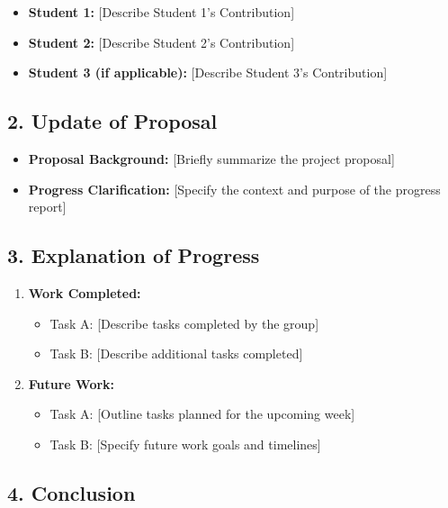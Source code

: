 \begin{itemize}
	\item \textbf{Student 1:} [Describe Student 1's Contribution]
	\item \textbf{Student 2:} [Describe Student 2's Contribution]
	\item \textbf{Student 3 (if applicable):} [Describe Student 3's Contribution]
\end{itemize}

\subsection*{2. Update of Proposal}

\begin{itemize}
	\item \textbf{Proposal Background:} [Briefly summarize the project proposal]
	\item \textbf{Progress Clarification:} [Specify the context and purpose of the progress report]
\end{itemize}

\subsection*{3. Explanation of Progress}

\begin{enumerate}
	\item \textbf{Work Completed:}
	\begin{itemize}
		\item Task A: [Describe tasks completed by the group]
		\item Task B: [Describe additional tasks completed]
	\end{itemize}
	
	\item \textbf{Future Work:}
	\begin{itemize}
		\item Task A: [Outline tasks planned for the upcoming week]
		\item Task B: [Specify future work goals and timelines]
	\end{itemize}
\end{enumerate}

\subsection*{4. Conclusion}

